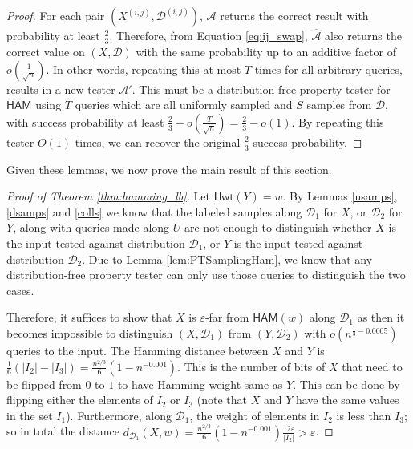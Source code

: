\documentclass[11pt]{article}
\newcommand{\Hamming}{\mathsf{Hwt}}
\newcommand{\HAM}{\mathsf{HAM}}
\newcommand{\sD}{\mathcal{D}}
\newcommand{\sA}{\mathcal{A}}
\begin{document}
\begin{proof}
For each pair $(X^{(i,j)},\mathcal{D}^{(i,j)})$, $\mathcal{A}$ returns the correct result with probability at least $\frac{2}{3}$. Therefore, from Equation \ref{eq:ij_swap}, $\hat{\sA}$ also returns the correct value on $(X,\mathcal{D})$ with the same probability up to an additive factor of $o\left(\frac{1}{\sqrt{n}}\right)$. In other words, repeating this at most $T$ times for all arbitrary queries, results in a new tester $\sA'$. This must be a distribution-free property tester for $\HAM$ using $T$ queries which are all uniformly sampled and $S$ samples from $\sD$, with success probability at least $\frac{2}{3}-o\left(\frac{T}{\sqrt{n}}\right)=\frac{2}{3}-o(1)$. By repeating this tester $O(1)$ times, we can recover the original $\frac{2}{3}$ success probability.
\end{proof}

\noindent Given these lemmas, we now prove the main result of this section.
\begin{proof}[Proof of Theorem \ref{thm:hamming_lb}]
Let $\Hamming(Y) = w$. By Lemmas \ref{usamps}, \ref{dsamps} and \ref{colls} we know that the labeled samples along $\sD_{1}$ for $X$, or $\sD_{2}$ for $Y$, along with queries made along $U$ are not enough to distinguish whether $X$ is the input tested against distribution $\mathcal{D}_{1}$, or $Y$ is the input tested against distribution $\mathcal{D}_{2}$. Due to Lemma \ref{lem:PTSamplingHam}, we know that any distribution-free property tester can only use those queries to distinguish the two cases. 

Therefore, it suffices to show that $X$ is $\varepsilon$-far from $\HAM(w)$ along $\mathcal{D}_{1}$ as then it becomes impossible to distinguish $(X, \mathcal{D}_{1})$ from $(Y, \mathcal{D}_{2})$ with $o(n^{\frac{1}{3}-0.0005})$ queries to the input. The Hamming distance between $X$ and $Y$ is $\frac{1}{6}(|I_{2}|-|I_{3}|)=\frac{n^{2/3}}{6}(1-n^{-0.001})$. This is the number of bits of $X$ that need to be flipped from $0$ to $1$ to have Hamming weight same as $Y$. This can be done by flipping either the elements of $I_{2}$ or $I_{3}$ (note that $X$ and $Y$ have the same values in the set $I_{1}$). Furthermore, along $\sD_{1}$, the weight of elements in $I_{2}$ is less than $I_{3}$; so in total the distance $d_{\sD_{1}}(X, w)=\frac{n^{2/3}}{6}(1-n^{-0.001}) \frac{12\varepsilon}{|I_{2}|}>\varepsilon$.
\end{proof}
\end{document}

